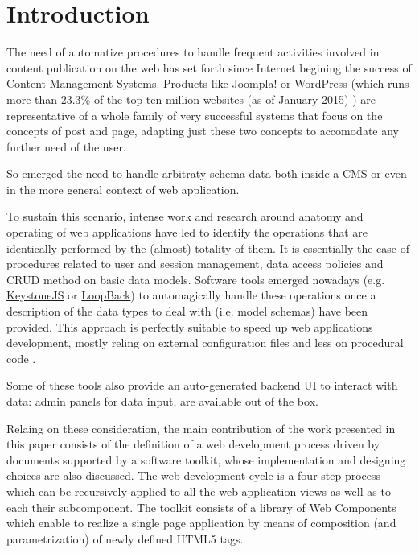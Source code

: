\section{Introduction}\label{sec:introduction}

The need of automatize procedures to handle frequent activities involved in content publication on the web has set forth since Internet begining the success of Content Management Systems. Products like \href{http://www.joomla.org/}{Joompla!} or \href{https://wordpress.org/}{WordPress} (which runs more than 23.3\% of the top ten million websites (as of January 2015) \cite{usage-cms}) are representative of a whole family of very successful systems that focus on the concepts of post and page, adapting just these two concepts to accomodate any further need of the user. 

So emerged the need to handle arbitraty-schema data both inside a CMS or even in the more general context of web application.

To sustain this scenario, intense work and research around anatomy and operating of web applications have led to identify the operations that are identically performed by the (almost) totality of them. It is essentially the case of procedures related to user and session management, data access policies and CRUD method on basic data models.
Software tools emerged nowadays (e.g. \href{http://keystonejs.com}{KeystoneJS} or \href{http://loopback.io}{LoopBack}) to automagically handle these operations once a description of the data types to deal with (i.e. model schemas) have been provided. This approach is perfectly suitable to speed up web applications development, mostly reling on external configuration files and less on procedural code \cite{6859693}.

Some of these tools also provide an auto-generated backend UI to interact with data: admin panels for data input, are available out of the box.

Relaing on these consideration, the main contribution of the work presented in this paper consists of the definition of a web development process driven by documents supported by a software toolkit, whose implementation and designing choices are also discussed. The web development cycle is a four-step process which can be recursively applied to all the web application views as well as to each their subcomponent. The toolkit consists of a library of Web Components which enable to realize a single page application by means of composition (and parametrization) of newly defined HTML5 tags.

